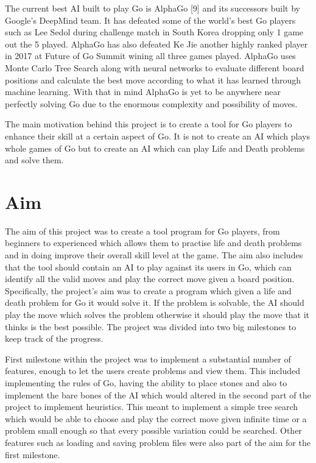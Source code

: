 \documentclass{l4proj}
\begin{document}
The current best AI built to play Go is AlphaGo [9] and its successors built by Google’s DeepMind team. It has defeated some of the world’s best Go players such as Lee Sedol during challenge match in South Korea dropping only 1 game out the 5 played. AlphaGo has also defeated Ke Jie  another highly ranked player in 2017 at Future of Go Summit wining all three games played. AlphaGo uses Monte Carlo Tree Search along with neural networks to evaluate different board positions and calculate the best move according to what it has learned through machine learning. With that in mind AlphaGo is yet to be anywhere near perfectly solving Go due to the enormous complexity and possibility of moves.

The  main motivation behind this project is to create a tool for Go players to enhance their skill at a certain aspect of Go. It is not to create an AI which plays whole games of Go but to create an AI which can play Life and Death problems and solve them.
\section{Aim}
The aim of this project was to create a tool program for Go players, from beginners to experienced  which allows them to practise life and death problems and in doing improve their overall skill level at the game.  The aim also includes that the tool should contain an AI to play against its users in Go, which can identify all the valid moves and play the correct move given a board position.
Specifically, the project’s aim was to create a program which given a life and death  problem for Go it would solve it. If the problem is solvable,  the AI should play the move which solves the problem otherwise it should play the move that it thinks is the best possible. The project was divided into two big milestones to keep track of the progress.

First milestone within the project was to implement a substantial number of features, enough to let the users create problems and view them. This included implementing the rules of Go, having the ability to place stones and also to implement the bare bones of the AI which would altered in the second part of the project to implement heuristics. This meant to implement a simple tree search which would be able to choose and play the correct move given infinite time or a problem small enough so that every possible variation could be searched. Other features such as loading and saving problem files were also part of the aim for the first milestone.
\end{document}
